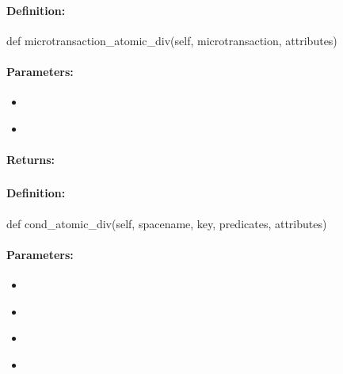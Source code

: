 \paragraph{Definition:}
\begin{pythoncode}
def microtransaction_atomic_div(self, microtransaction, attributes)
\end{pythoncode}

\paragraph{Parameters:}
\begin{itemize}[noitemsep]
\item {}\\

\item {}\\

\end{itemize}

\paragraph{Returns:}


\pagebreak
\subsubsection{}
\label{api:python:cond_atomic_div}


\paragraph{Definition:}
\begin{pythoncode}
def cond_atomic_div(self, spacename, key, predicates, attributes)
\end{pythoncode}

\paragraph{Parameters:}
\begin{itemize}[noitemsep]
\item {}\\

\item {}\\

\item {}\\

\item {}\\

\end{itemize}


